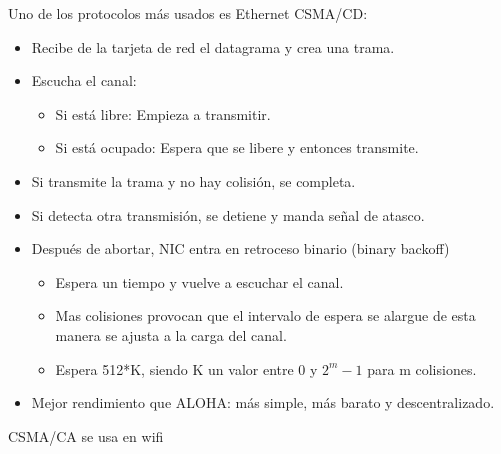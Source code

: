 \documentclass[12pt, twoside, openright]{report} %
\begin{document}
Uno de los protocolos más usados es Ethernet CSMA/CD:

\begin{itemize}
	\item Recibe de la tarjeta de red el datagrama y crea una trama.
	\item Escucha el canal:

	      \begin{itemize}
		      \item Si está libre: Empieza a transmitir.
		      \item Si está ocupado: Espera que se libere y entonces
		            transmite.
	      \end{itemize}
	\item Si transmite la trama y no hay colisión, se completa.
	\item Si detecta otra transmisión, se detiene y manda señal de
	      atasco.
	\item Después de abortar, NIC entra en retroceso binario (binary
	      backoff)

	      \begin{itemize}
		      \item Espera un tiempo y vuelve a escuchar el canal.
		      \item Mas colisiones provocan que el intervalo de espera se
		            alargue de esta manera se ajusta a la carga del canal.
		      \item Espera 512*K, siendo K un valor entre 0 y \(2^{m}-1\) para
		            m colisiones.
	      \end{itemize}
	\item Mejor rendimiento que ALOHA: más simple, más barato y
	      descentralizado.
\end{itemize}

CSMA/CA se usa en wifi
\end{document}
